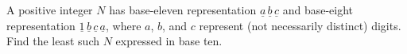 A positive integer $N$ has base-eleven representation $\underline{a}\,\underline{b}\,\underline{c}$ and base-eight representation $\underline{1}\,\underline{b}\,\underline{c}\,\underline{a}$, where $a$, $b$, and $c$ represent (not necessarily distinct) digits. Find the least such $N$ expressed in base ten.